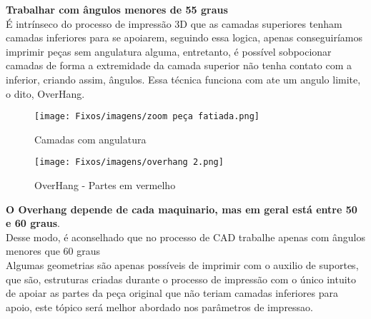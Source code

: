 \textbf{Trabalhar com ângulos menores de 55 graus} \\[0.2cm]



É intrínseco do processo de impressão 3D que as camadas superiores tenham camadas inferiores para se apoiarem, seguindo essa logica, apenas conseguiríamos imprimir peças sem angulatura alguma, entretanto, é possível sobpocionar camadas de forma a extremidade da camada superior não tenha contato com a inferior, criando assim, ângulos. Essa técnica funciona com ate um angulo limite, o dito, OverHang.\\[0.2cm]



\begin{figure}[h!]

    \centering

    \texttt{[image: Fixos/imagens/zoom peça fatiada.png]}

    \caption{Camadas com angulatura}

    \label{fig:my_label}

\end{figure}



\begin{figure}[h!]

    \centering

    \texttt{[image: Fixos/imagens/overhang 2.png]}

    \caption{OverHang - Partes em vermelho}

    \label{fig:my_label}

\end{figure}



\textbf{O Overhang depende de cada maquinario, mas em geral está entre 50 e 60 graus}.\\[0.2cm]



Desse modo, é aconselhado que no processo de CAD trabalhe apenas com ângulos menores que 60 graus\\[0.2cm]



Algumas geometrias são apenas possíveis de imprimir com o auxilio de suportes, que são, estruturas criadas durante o processo de impressão com o único intuito de apoiar as partes da peça original que não teriam camadas inferiores para apoio, este tópico será melhor abordado nos parâmetros de impressao.\\[0.2cm]







